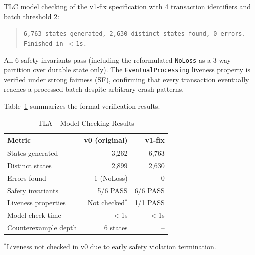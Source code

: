 TLC model checking of the v1-fix specification with 4 transaction identifiers
and batch threshold 2:

\begin{quote}
\texttt{6,763 states generated, 2,630 distinct states found, 0 errors.}\\
\texttt{Finished in $<$1s.}
\end{quote}

All 6 safety invariants pass (including the reformulated \texttt{NoLoss} as
a 3-way partition over durable state only). The \texttt{EventualProcessing}
liveness property is verified under strong fairness (SF), confirming that
every transaction eventually reaches a processed batch despite arbitrary
crash patterns.

Table~\ref{tab:formal} summarizes the formal verification results.

\begin{table}[ht]
\centering
\caption{TLA+ Model Checking Results}
\label{tab:formal}
\begin{tabular}{lrr}
\toprule
\textbf{Metric} & \textbf{v0 (original)} & \textbf{v1-fix} \\
\midrule
States generated     & 3,262  & 6,763 \\
Distinct states      & 2,899  & 2,630 \\
Errors found         & 1 (NoLoss) & 0 \\
Safety invariants    & 5/6 PASS   & 6/6 PASS \\
Liveness properties  & Not checked$^*$ & 1/1 PASS \\
Model check time     & $<$1s       & $<$1s \\
Counterexample depth & 6 states    & -- \\
\bottomrule
\end{tabular}
\begin{flushleft}
\small $^*$Liveness not checked in v0 due to early safety violation termination.
\end{flushleft}
\end{table}
